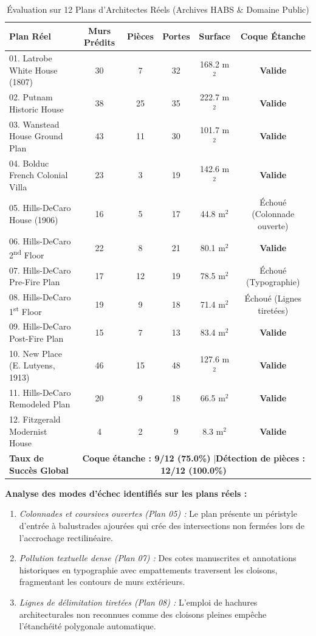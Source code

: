 \documentclass[11pt,a4paper]{report}
\begin{document}
\begin{table}[H]
\centering
\caption{Évaluation sur 12 Plans d'Architectes Réels (Archives HABS \& Domaine Public)}
\label{tab:real_external_eval}
\small
\begin{tabular}{lccccc}
\toprule
\textbf{Plan Réel} & \textbf{Murs Prédits} & \textbf{Pièces} & \textbf{Portes} & \textbf{Surface} & \textbf{Coque Étanche} \\
\midrule
01. Latrobe White House (1807)      & 30 & 7  & 32 & 168.2 m$^2$ & \textbf{Valide} \\
02. Putnam Historic House           & 38 & 25 & 35 & 222.7 m$^2$ & \textbf{Valide} \\
03. Wanstead House Ground Plan      & 43 & 11 & 30 & 101.7 m$^2$ & \textbf{Valide} \\
04. Bolduc French Colonial Villa    & 23 & 3  & 19 & 142.6 m$^2$ & \textbf{Valide} \\
05. Hills-DeCaro House (1906)       & 16 & 5  & 17 & 44.8 m$^2$  & Échoué (Colonnade ouverte) \\
06. Hills-DeCaro 2\textsuperscript{nd} Floor & 22 & 8 & 21 & 80.1 m$^2$  & \textbf{Valide} \\
07. Hills-DeCaro Pre-Fire Plan      & 17 & 12 & 19 & 78.5 m$^2$  & Échoué (Typographie) \\
08. Hills-DeCaro 1\textsuperscript{st} Floor & 19 & 9 & 18 & 71.4 m$^2$  & Échoué (Lignes tiretées) \\
09. Hills-DeCaro Post-Fire Plan     & 15 & 7  & 13 & 83.4 m$^2$  & \textbf{Valide} \\
10. New Place (E. Lutyens, 1913)    & 46 & 15 & 48 & 127.6 m$^2$ & \textbf{Valide} \\
11. Hills-DeCaro Remodeled Plan     & 20 & 9  & 18 & 66.5 m$^2$  & \textbf{Valide} \\
12. Fitzgerald Modernist House      & 4  & 2  & 9  & 8.3 m$^2$   & \textbf{Valide} \\
\midrule
\textbf{Taux de Succès Global} & \multicolumn{5}{c}{\textbf{Coque étanche : 9/12 (75.0\%)} \quad|\quad \textbf{Détection de pièces : 12/12 (100.0\%)}} \\
\bottomrule
\end{tabular}
\end{table}

\noindent\textbf{Analyse des modes d'échec identifiés sur les plans réels :}
\begin{enumerate}
    \item \emph{Colonnades et coursives ouvertes (Plan 05) :} Le plan présente un péristyle d'entrée à balustrades ajourées qui crée des intersections non fermées lors de l'accrochage rectilinéaire.
    \item \emph{Pollution textuelle dense (Plan 07) :} Des cotes manuscrites et annotations historiques en typographie avec empattements traversent les cloisons, fragmentant les contours de murs extérieurs.
    \item \emph{Lignes de délimitation tiretées (Plan 08) :} L'emploi de hachures architecturales non reconnues comme des cloisons pleines empêche l'étanchéité polygonale automatique.
\end{enumerate}
\end{document}
